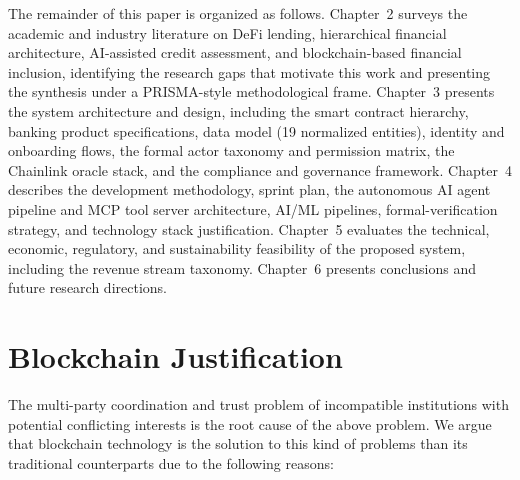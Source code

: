 \documentclass[12pt,a4paper]{report}
\begin{document}
The remainder of this paper is organized as follows. Chapter~2 surveys the academic and industry literature on DeFi lending, hierarchical financial architecture, AI-assisted credit assessment, and blockchain-based financial inclusion, identifying the research gaps that motivate this work and presenting the synthesis under a PRISMA-style methodological frame. Chapter~3 presents the system architecture and design, including the smart contract hierarchy, banking product specifications, data model (19 normalized entities), identity and onboarding flows, the formal actor taxonomy and permission matrix, the Chainlink oracle stack, and the compliance and governance framework. Chapter~4 describes the development methodology, sprint plan, the autonomous AI agent pipeline and MCP tool server architecture, AI/ML pipelines, formal-verification strategy, and technology stack justification. Chapter~5 evaluates the technical, economic, regulatory, and sustainability feasibility of the proposed system, including the revenue stream taxonomy. Chapter~6 presents conclusions and future research directions.

\section{Blockchain Justification}

The multi-party coordination and trust problem of incompatible institutions with potential conflicting interests is the root cause of the above problem. We argue that blockchain technology is the solution to this kind of problems than its traditional counterparts due to the following reasons:
\end{document}
